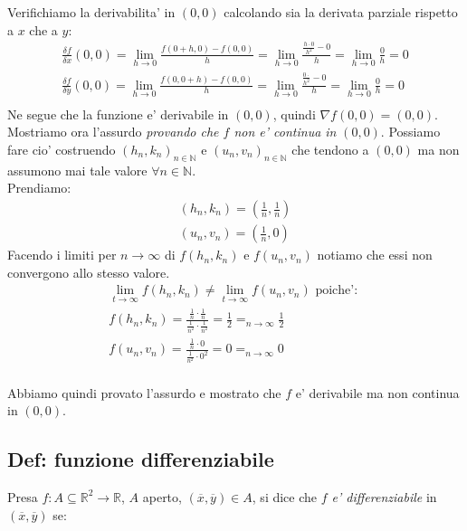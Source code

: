 \documentclass{article}
\begin{document}
\noindent Verifichiamo la derivabilita' in $(0,0)$ calcolando sia la derivata parziale rispetto
a $x$ che a $y$:
\begin{align*}
  \frac{\delta f}{\delta x}(0,0) = \lim_{h \to 0} \frac{f(0 + h, 0) - f(0, 0)}{h} =
  \lim_{h \to 0} \frac{\frac{h\cdot0}{h^2} - 0}{h} = \lim_{h \to 0} \frac{0}{h} = 0 \\
  \frac{\delta f}{\delta y}(0,0) = \lim_{h \to 0} \frac{f(0, 0 + h) - f(0, 0)}{h} =
  \lim_{h \to 0} \frac{\frac{0\cdot}{h^2} - 0}{h} = \lim_{h \to 0} \frac{0}{h} = 0 \\
\end{align*}
Ne segue che la funzione e' derivabile in $(0, 0)$, quindi $\nabla f(0, 0) = (0, 0)$. \\
Mostriamo ora l'assurdo \emph{provando che $f$ non e' continua in} $(0, 0)$.
Possiamo fare cio' costruendo $(h_n, k_n)_{n \in \mathbb{N}}$ e $(u_n, v_n)_{n \in \mathbb{N}}$
che tendono a $(0, 0)$ ma non assumono mai tale valore $\forall n \in \mathbb{N}$. \\
Prendiamo:
\begin{align*}
  (h_n, k_n) = (\frac{1}{n}, \frac{1}{n}) \\
  (u_n, v_n) = (\frac{1}{n}, 0)
\end{align*}
Facendo i limiti per $n \to \infty$ di $f(h_n, k_n)$ e $f(u_n, v_n)$ notiamo che
essi non convergono allo stesso valore.
\begin{align*}
  \lim_{t \to \infty} f(h_n, k_n) \neq \lim_{t \to \infty} f(u_n, v_n) \text{ poiche': } \\
  f(h_n, k_n) = \frac{\frac{1}{n} \cdot \frac{1}{n}}{\frac{1}{n^2} \cdot \frac{1}{n^2}} =
  \frac{1}{2} =_{n \to \infty} \frac{1}{2} \\
  f(u_n, v_n) = \frac{\frac{1}{n} \cdot 0}{\frac{1}{n^2} \cdot 0^2} =
  0 =_{n \to \infty} 0 \\
\end{align*}

\noindent Abbiamo quindi provato l'assurdo e mostrato che $f$ e' derivabile ma
non continua in $(0, 0)$.

\subsection{Def: funzione differenziabile}

Presa $f: A \subseteq \mathbb{R}^2 \to \mathbb{R}$, $A$ aperto, $(\overline{x},
\overline{y}) \in A$, si dice che \emph{$f$ e' differenziabile} in $(\overline{x},
\overline{y})$ se:
\end{document}
